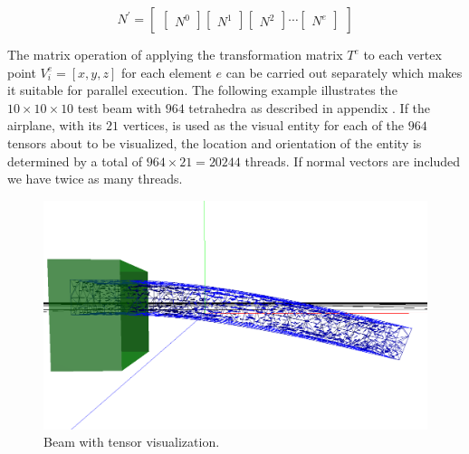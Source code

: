 \begin{equation}
N^\prime = 
\begin{bmatrix} 
\begin{bmatrix} 
N^0
\end{bmatrix} 
\begin{bmatrix} 
N^1
\end{bmatrix} 
\begin{bmatrix} 
N^2
\end{bmatrix} 
\dotsb
\begin{bmatrix} 
N^e
\end{bmatrix} 
\end{bmatrix} 
\label{eq:absolute_model_normals}
\end{equation} 


The matrix operation of applying the transformation
matrix $T^e$ to each vertex point $V^e_i = [x, y, z]$ for each element
$e$ can be carried out separately which makes it suitable for parallel
execution. The following example illustrates the $10 \times 10 \times
10$ test beam with $964$ tetrahedra as described in appendix 
. 
%
If the airplane, with its $21$ vertices, is used as the visual entity
for each of the $964$ tensors about to be visualized, the location and
orientation of the entity is determined by a total of $964 \times 21 =
20244$ threads. If normal vectors are included we have twice as many
threads.

\begin{figure}
  \centering
  \includegraphics[width=12cm]{./images/helper_tools_tensor_visualization_0.png}
\caption{Beam with tensor visualization.}
\label{fig:tensor_visualization_with_planes}
\end{figure}

